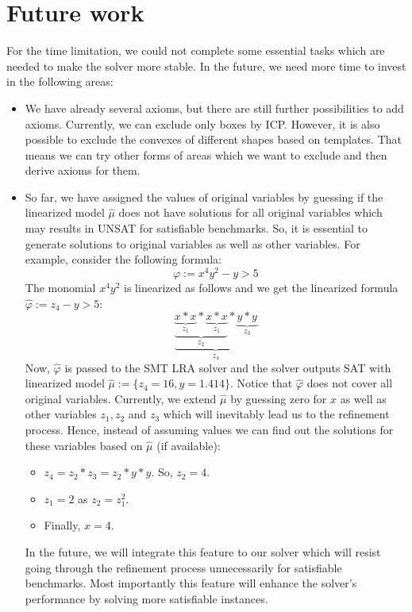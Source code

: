 \section{Future work}
\label{sec:Future_Work}
For the time limitation, we could not complete some essential tasks which are needed to make the solver more stable.  
In the future, we need more time to invest in the following areas:
\begin{itemize}
    \item We have already several axioms, but there are still further possibilities to add axioms.
    Currently, we can exclude only boxes by ICP.
    However, it is also possible to exclude the convexes of different shapes based on templates.
    That means we can try other forms of areas which we want to exclude and then derive axioms for them.
    \item So far, we have assigned the values of original variables by guessing if the linearized model $\hat{\mu}$ does not have solutions for all original variables which may results in UNSAT for satisfiable benchmarks.
    So, it is essential to generate solutions to original variables as well as other variables.
    For example, consider the following formula:
    $$\varphi := x^4y^2 - y > 5$$
   The monomial $x^4y^2$ is linearized as follows and we get the linearized formula $\hat{\varphi} := z_4 -y > 5$:
    $$\underbrace{ \underbrace{ \underbrace{ x \ast x }\limits_{z_{1}} \ast \underbrace{ x \ast x }\limits_{z_{1}}}\limits_{z_{2}} \ast \underbrace{ y \ast y }\limits_{z_{3}}}\limits_{z_{4}}$$
    Now, $\hat{\varphi}$ is passed to the SMT LRA solver and the solver outputs SAT with linearized model $\hat{\mu} := \{z_4 = 16, y = 1.414\}$.
    Notice that $\hat{\varphi}$ does not cover all original variables. 
    Currently, we extend $\hat{\mu}$ by guessing zero for $x$ as well as other variables $z_1, z_2$ and $z_3$ which will inevitably lead us to the refinement process.
    Hence, instead of assuming values we can find out the solutions for these variables based on $\hat{\mu}$ (if available):
    \begin{itemize} 
        \item  $z_4 = z_2 \ast z_3 = z_2 \ast y \ast y$.
        So, $z_2 = 4$.
        \item $z_1 = 2$ as $z_2 = z_1^2$.
        \item Finally, $x = 4$.
     \end{itemize}
     In the future, we will integrate this feature to our solver which will resist going through the refinement process unnecessarily for satisfiable benchmarks.
     Most importantly this feature will enhance the solver's performance by solving more satisfiable instances.
\end{itemize}

